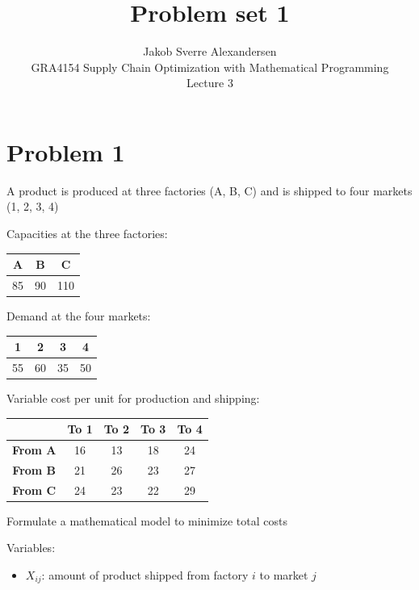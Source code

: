 \documentclass[10pt]{article}
\begin{document}
 
\title{Problem set 1}
\author{Jakob Sverre Alexandersen\\
GRA4154 Supply Chain Optimization with Mathematical Programming\\
Lecture 3}
\maketitle

\tableofcontents
\newpage
\section{Problem 1}
A product is produced at three factories (A, B, C) and is shipped to four markets (1, 2, 3, 4)

Capacities at the three factories: 
\begin{center}
    \begin{tabular}{|c|c|c|}
        \hline 
        \textbf{A} & \textbf{B} & \textbf{C}\\\hline 
        85 & 90 & 110 \\\hline 
    \end{tabular}
\end{center}
Demand at the four markets: 
\begin{center}
    \begin{tabular}{|c|c|c|c|}
        \hline 
        \textbf{1} & \textbf{2} & \textbf{3} & \textbf{4}\\\hline 
        55 & 60 & 35 & 50\\\hline 
    \end{tabular}
\end{center}
Variable cost per unit for production and shipping: 
\begin{center}
    \begin{tabular}{|c|c|c|c|c|}
        \hline 
        & \textbf{To 1} & \textbf{To 2} & \textbf{To 3} & \textbf{To 4}\\\hline 
        \textbf{From A} & 16 & 13 & 18 & 24\\\hline
        \textbf{From B} & 21 & 26 & 23 & 27\\\hline
        \textbf{From C} & 24 & 23 & 22 & 29\\\hline
    \end{tabular}
\end{center}
Formulate a mathematical model to minimize total costs

Variables: 
\begin{itemize}
    \item $X_{ij}$: amount of product shipped from factory $i $ to market $j $
\end{itemize}
\end{document}
